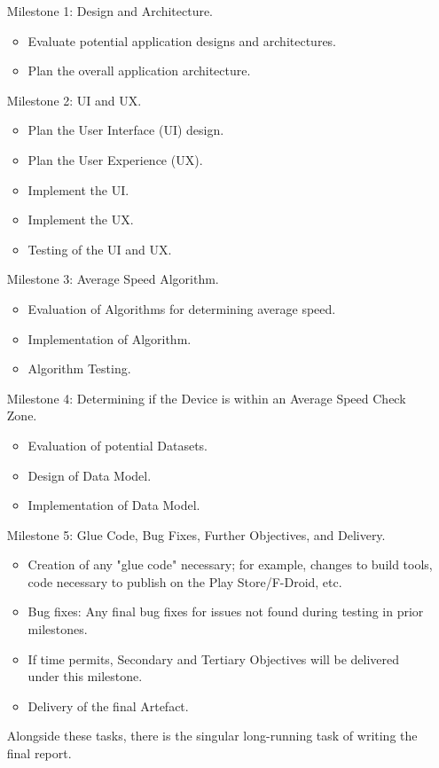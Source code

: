 \documentclass[11pt, a4paper, notitlepage]{report}
\begin{document}
\begin{enumerate}
    \item [Milestone 1:]Design and Architecture.
    \begin{itemize}
        \item Evaluate potential application designs and architectures.
        \item Plan the overall application architecture.
    \end{itemize}
    \item [Milestone 2:]UI and UX.
    \begin{itemize}
        \item Plan the User Interface (UI) design.
        \item Plan the User Experience (UX).
        \item Implement the UI.
        \item Implement the UX.
        \item Testing of the UI and UX.
    \end{itemize}
    \item [Milestone 3:]Average Speed Algorithm.
    \begin{itemize}
        \item Evaluation of Algorithms for determining average speed.
        \item Implementation of Algorithm.
        \item Algorithm Testing.
    \end{itemize}
    \item [Milestone 4:]Determining if the Device is within an Average Speed Check Zone.
    \begin{itemize}
        \item Evaluation of potential Datasets.
        \item Design of Data Model.
        \item Implementation of Data Model.
    \end{itemize}
    \item [Milestone 5:]Glue Code, Bug Fixes, Further Objectives, and Delivery.
    \begin{itemize}
        \item Creation of any "glue code" necessary; for example, changes to 
        build tools, code necessary to publish on the Play Store/F-Droid, etc.
        \item Bug fixes: Any final bug fixes for issues not found during 
        testing in prior milestones.
        \item If time permits, Secondary and Tertiary Objectives will be 
        delivered under this milestone.
        \item Delivery of the final Artefact.
    \end{itemize}

Alongside these tasks, there is the singular long-running task of writing the 
final report.
\end{enumerate}
\end{document}
